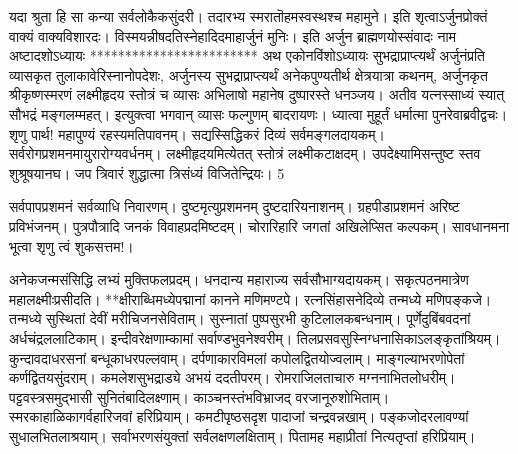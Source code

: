   यदा श्रुता हि सा कन्या सर्वलोकैकसुंदरी।
 तदारभ्य स्मरातॊहमस्वस्थश्च महामुने।
 इति शृत्वाऽर्जुनप्रोक्तं वाक्यं वाक्यविशारदः।
 विस्मयन्नीषदतिस्नेहादिदमाहार्जुनं मुनिः।
 इति अर्जुन ब्राह्मणयोस्संवादः नाम
अष्टादशोऽध्यायः
************************
अथ एकोनविंशोऽध्यायः सुभद्राप्राप्त्यर्थं अर्जुनंप्रति व्यासकृत तुलाकावेरिस्नानोपदेशः, अर्जुनस्य सुभद्राप्राप्त्यर्थं अनेकपुण्यतीर्थ क्षेत्रयात्रा कथनम्, अर्जुनकृत
श्रीकृष्णस्मरणं लक्ष्मीहृदय स्तोत्रं च
व्यासः
अभिलाषो महानेष दुष्पारस्ते धनञ्जय।
 अतीव यत्नस्साध्यं स्यात् सौभद्रं मङ्गलम्महत्।
 इत्युक्त्वा भगवान् व्यासः फल्गुणम् बादरायणः।
 ध्यात्वा मुहूर्तं धर्मात्मा पुनरेवाब्रवीद्वचः।
 शृणु पार्थ! महापुण्यं रहस्यमतिपावनम्।
 सद्यस्सिद्धिकरं दिव्यं सर्वमङ्गलदायकम्।
 सर्वरोगप्रशमनमायुरारोग्यवर्धनम्।
 लक्ष्मीहृदयमित्येतत् स्तोत्रं लक्ष्मीकटाक्षदम्।
 उपदेक्ष्यामिसन्तुष्ट स्तव शुश्रूषयानघ।
 जप त्रिवारं शुद्धात्मा त्रिसंध्यं विजितेन्द्रियः।
 5

  सर्वपापप्रशमनं सर्वव्याधि निवारणम्।
 दुष्टमृत्युप्रशमनम् दुष्टदारियनाशनम्।
 ग्रहपीडाप्रशमनं अरिष्ट प्रविभंजनम्।
 पुत्रपौत्रादि जनकं विवाहप्रदमिष्टदम्।
 चोरारिहारि जगतां अखिलेप्सित कल्पकम्।
 सावधानमना भूत्वा शृणु त्वं शुकसत्तम!।
 
अनेकजन्मसंसिद्धि लभ्यं मुक्तिफलप्रदम्।
 धनदान्य महाराज्य सर्वसौभाग्यदायकम्।
 सकृत्पठनमात्रेण महालक्ष्मीःप्रसीदति।
 **क्षीराब्धिमध्येपद्मानां कानने मणिमण्टपे।
 रत्नसिंहासनेदिव्ये तन्मध्ये मणिपङ्कजे।
 तन्मध्ये सुस्थितां देवीं मरीचिजनसेविताम्।
 सुस्नातां पुष्पसुरभी कुटिलालकबन्धनाम्।
 पूर्णेदुबिंबवदनां अर्धचंद्रललाटिकाम्।
 इन्दीवरेक्षणाम्कामां सर्वाण्डभुवनेश्वरीम्।
 तिलप्रसवसुस्निग्धनासिकाऽलङ्कृतांश्रियम्।
 कुन्दावदाधरसनां बन्धूकाधरपल्लवाम्।
 दर्पणाकारविमलां कपोलद्वितयोज्वलाम्।
 माङ्गल्याभरणोपेतां कर्णद्वितयसुंदराम्।
 कमलेशसुभद्राड्ये अभयं ददतीपरम्।
 रोमराजिलताचारु मग्ननाभितलोधरीम्।
 पट्टवस्त्रसमुद्भासी सुनितंबादिलक्ष्णाम्।
 काञ्चनस्तंभविभ्राजद् वरजानूरुशोभिताम्।
 स्मरकाहाळिकागर्वहारिजवां हरिप्रियाम्।
 कमटीपृष्ठसदृश पादाजां चन्द्रवन्नखाम्।
 पङ्कजोदरलावण्यां सुधालभितलाश्रयाम्।
 सर्वाभरणसंयुक्तां सर्वलक्षणलक्षिताम्।
 पितामह महाप्रीतां नित्यतृप्तां हरिप्रियाम्।
 
